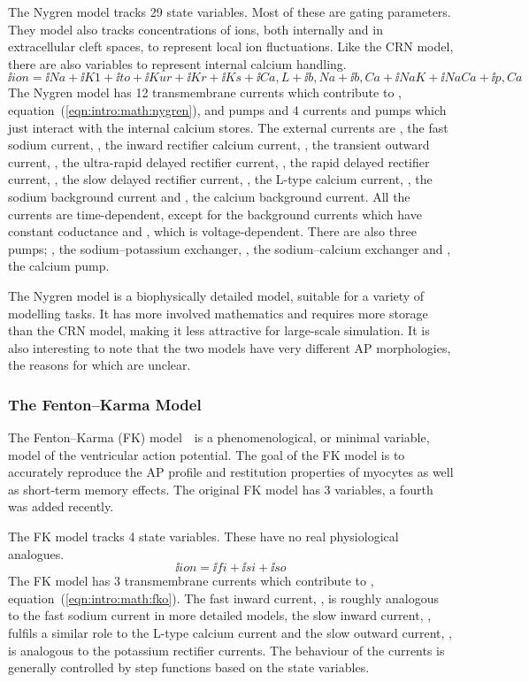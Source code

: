 The Nygren model tracks 29 state variables.
Most of these are gating parameters.
They model also tracks concentrations of ions, both internally and in
extracellular cleft spaces, to represent local ion fluctuations.
Like the CRN model, there are also variables to represent internal calcium
handling.
\begin{equation}
\label{eqn:intro:math:nygren}
\ii{ion} = \ii{Na} + \ii{K1} + \ii{to} + \ii{Kur} + \ii{Kr} + \ii{Ks} +
\ii{Ca,L} + \ii{b,Na} + \ii{b,Ca} + \ii{NaK} + \ii{NaCa} + \ii{p,Ca}
\end{equation}
The Nygren model has 12 transmembrane currents which contribute to ,
equation~(\ref{eqn:intro:math:nygren}), and pumps and 4 currents and
pumps which just interact with the internal calcium stores.
The external currents are , the fast sodium current, , the inward
rectifier calcium current, , the transient outward current, , the
ultra-rapid delayed rectifier current, , the rapid delayed rectifier
current, , the slow delayed rectifier current, , the L-type
calcium current, , the sodium background current and , the
calcium background current.
All the currents are time-dependent, except for the background currents which
have constant coductance and , which is voltage-dependent.
There are also three pumps; , the sodium--potassium exchanger,
, the sodium--calcium exchanger and , the calcium pump.

The Nygren model is a biophysically detailed model, suitable for a variety of
modelling tasks.
It has more involved mathematics and requires more storage than the CRN model,
making it less attractive for large-scale simulation.
It is also interesting to note that the two models have very different
AP morphologies, the reasons for which are unclear.

\subsubsection{The Fenton--Karma Model}

The Fenton--Karma (FK) model~\cite{Fenton1998,Bueno-Orovio2008}\ is a
phenomenological, or minimal variable, model of the ventricular action
potential.
The goal of the FK model is to accurately reproduce the AP profile and
restitution properties of myocytes as well as short-term memory effects.
The original FK model has 3 variables, a fourth was added recently.

The FK model tracks 4 state variables.
These have no real physiological analogues.
\begin{equation}
\label{eqn:intro:math:fko}
\ii{ion} = \ii{fi} + \ii{si} + \ii{so}
\end{equation}
The FK model has 3 transmembrane currents which contribute to ,
equation~(\ref{eqn:intro:math:fko}).
The fast inward current, , is roughly analogous to the fast sodium
current in more detailed models, the slow inward current, , fulfils a
similar role to the L-type calcium current and the slow outward current, ,
is analogous to the potassium rectifier currents.
The behaviour of the currents is generally controlled by step functions based
on the state variables.

